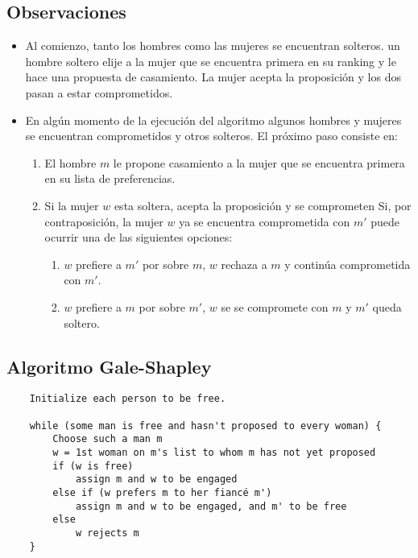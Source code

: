\documentclass[12pt, fleqn]{article}
\theoremstyle{remark}
\theoremstyle{definition}
\begin{document}
\subsection{Observaciones}
\begin{itemize}
    \item Al comienzo, tanto los hombres como las mujeres se encuentran solteros.
            un hombre soltero elije a la mujer que se encuentra primera en su ranking
            y le hace una propuesta de casamiento.
            La mujer acepta la proposición y los dos pasan a estar comprometidos.
    \item En algún momento de la ejecución del algoritmo algunos hombres y mujeres
            se encuentran comprometidos y otros solteros. El próximo paso consiste en:
            \begin{enumerate}
                \item El hombre \(m\) le propone casamiento a la mujer que se encuentra
                        primera en su lista de preferencias.
                \item Si la mujer \(w\) esta soltera, acepta la proposición y se comprometen
                        Si, por contraposición, la mujer \(w\) ya se encuentra comprometida
                        con \(m'\) puede ocurrir una de las siguientes opciones:
                        \begin{enumerate}
                            \item \(w\) prefiere a \(m'\) por sobre \(m\), \(w\) rechaza
                                    a \(m\) y continúa comprometida con \(m'\).
                            \item \(w\) prefiere a \(m\) por sobre \(m'\), \(w\) se
                                    se compromete con \(m\) y \(m'\) queda soltero.        
                        \end{enumerate}
            \end{enumerate}
\end{itemize}
\subsection{Algoritmo Gale-Shapley}
\begin{verbatim}
    Initialize each person to be free.

    while (some man is free and hasn't proposed to every woman) {
        Choose such a man m
        w = 1st woman on m's list to whom m has not yet proposed
        if (w is free)
            assign m and w to be engaged
        else if (w prefers m to her fiancé m')
            assign m and w to be engaged, and m' to be free
        else
            w rejects m
    }
\end{verbatim}
\end{document}
